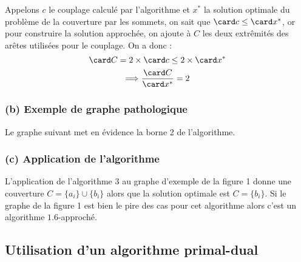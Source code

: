 Appelons $c$ le couplage calculé par l'algorithme et $x^*$ la solution optimale du problème de la
couverture par les sommets, on sait que $\card c \leq \card x^*$, or pour construire la solution
approchée, on ajoute à $C$ les deux extrêmités des arêtes utilisées pour le couplage. On a donc :$$
\card C = 2 \times \card c \leq 2 \times \card x^*$$ $$\Longrightarrow \frac{\card C}{\card x^*} =
2$$

\subsubsection{(b) Exemple de graphe pathologique}

Le graphe suivant met en évidence la borne 2 de l'algorithme.


\subsubsection{(c) Application de l'algorithme}
L'application de l'algorithme 3 au graphe d'exemple de la figure 1 donne une couverture $C = \{a_i\} \cup \{b_i\}$ alors que la solution optimale est $C = \{b_i\}$. Si le graphe de la figure 1 est bien le pire des cas pour cet algorithme alors c'est un algorithme $1.6$-approché.

\subsection{Utilisation d'un algorithme primal-dual}
